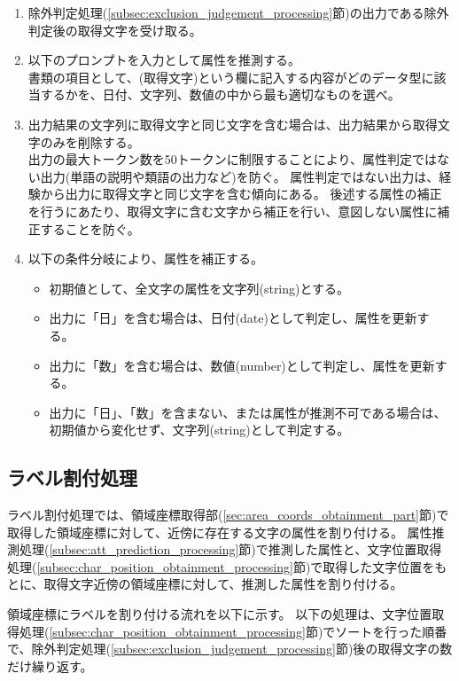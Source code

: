 \begin{enumerate}
    \item 除外判定処理(\ref{subsec:exclusion_judgement_processing}節)の出力である除外判定後の取得文字を受け取る。
    \item 以下のプロンプトを入力として属性を推測する。\\
        書類の項目として、(取得文字)という欄に記入する内容がどのデータ型に該当するかを、日付、文字列、数値の中から最も適切なものを選べ。
    \item 出力結果の文字列に取得文字と同じ文字を含む場合は、出力結果から取得文字のみを削除する。\\
        出力の最大トークン数を50トークンに制限することにより、属性判定ではない出力(単語の説明や類語の出力など)を防ぐ。
        属性判定ではない出力は、経験から出力に取得文字と同じ文字を含む傾向にある。
        後述する属性の補正を行うにあたり、取得文字に含む文字から補正を行い、意図しない属性に補正することを防ぐ。
    \item 以下の条件分岐により、属性を補正する。
        \begin{itemize}
            \item 初期値として、全文字の属性を文字列(string)とする。
            \item 出力に「日」を含む場合は、日付(date)として判定し、属性を更新する。
            \item 出力に「数」を含む場合は、数値(number)として判定し、属性を更新する。
            \item 出力に「日」、「数」を含まない、または属性が推測不可である場合は、初期値から変化せず、文字列(string)として判定する。
        \end{itemize}
\end{enumerate}



\subsection{ラベル割付処理}\label{subsec:label_link_processing}
ラベル割付処理では、領域座標取得部(\ref{sec:area_coords_obtainment_part}節)で取得した領域座標に対して、近傍に存在する文字の属性を割り付ける。
属性推測処理(\ref{subsec:att_prediction_processing}節)で推測した属性と、文字位置取得処理(\ref{subsec:char_position_obtainment_processing}節)で取得した文字位置をもとに、取得文字近傍の領域座標に対して、推測した属性を割り付ける。

領域座標にラベルを割り付ける流れを以下に示す。
以下の処理は、文字位置取得処理(\ref{subsec:char_position_obtainment_processing}節)でソートを行った順番で、除外判定処理(\ref{subsec:exclusion_judgement_processing}節)後の取得文字の数だけ繰り返す。

